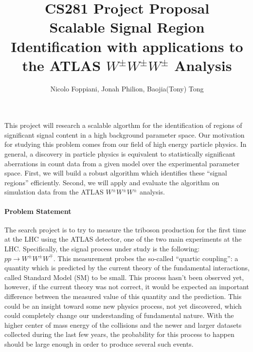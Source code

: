 \documentclass[11pt]{article}
\title{CS281 Project Proposal \\
	\large Scalable Signal Region Identification with applications to the ATLAS $W^\pm W^\pm W^\pm$ Analysis}
\author{Nicolo Foppiani, Jonah Philion, Baojia(Tony) Tong}
\date{}                                           %
\begin{document}
\maketitle

\paragraph{}
This project will research a scalable algorthm for the identification of regions of significant signal content in a high background parameter space. Our motivation for studying this problem comes from our field of high energy particle physics. In general, a discovery in particle physics is equivalent to statistically significant aberrations in count data from a given model over the experimental parameter space. First, we will build a robust algorithm which identifies these ``signal regions'' efficiently. Second, we will apply and evaluate the algorithm on simulation data from the ATLAS $W^\pm W^\pm W^\pm$ analysis.

\paragraph{Problem Statement}
The search project is to try to measure the triboson production for the first time at the LHC using the ATLAS detector, one of the two main experiments at the LHC. Specifically, the signal process under study is the following: $pp \rightarrow W^{\pm}W^{\pm}W^{\mp}$. 
This measurement probes the so-called ``quartic coupling'': a quantity which is predicted by the current theory of the fundamental interactions, called Standard Model (SM) to be small. This process hasn't been observed yet, however, if the current theory was not correct, it would be expected an important difference between the measured value of this quantity and the prediction. This could be an insight toward some new physics process, not yet discovered, which could completely change our understanding of fundamental nature. With the higher center of mass energy of the collisions and the newer and larger datasets collected during the last few years, the probability for this process to happen should be large enough in order to produce several such events.
\end{document}

